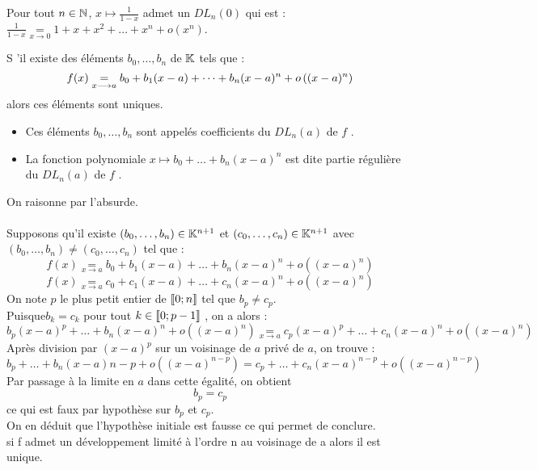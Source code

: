 \begin{defprop}
    Pour tout \(n \in  \mathbb{N}\), \(x \mapsto  \frac{1}{1 - x}\) admet un \(DL_n(0)\) qui est : \(\frac{1}{1 - x} \underset{x \to 0}{=} 1 + x + x^2 + \dots + x^n + o(x^n)\).
\end{defprop}

\begin{defprop}
   S ’il existe des éléments \(b_0, \dots, b_n\) de \(\mathbb{K}\) tels que :
   \[f (x) \underset{x \longrightarrow a}{=} b_0 + b_1(x - a) + \dots + b_n(x - a)^n + o \left((x - a)^n\right)\]
   alors ces éléments sont uniques.
   \begin{itemize}
        \item Ces éléments \(b_0, \dots, b_n\) sont appelés coefficients du \(DL_n(a)\) de \(f\) .
        \item La fonction polynomiale \(x \mapsto  b_0 + \dots + b_n(x - a)^n\) est dite partie régulière du \(DL_n(a)\) de \(f\) .
   \end{itemize}
\end{defprop}

\begin{dem}
    On raisonne par l’absurde.\\~\\
    Supposons qu’il existe \((b_0, \dots, b_n) \in \mathbb{K}^{n+1}\) et \((c_0, \dots, c_n) \in \mathbb{K}^{n+1}\) avec \((b_0, \dots, b_n)\neq (c_0, \dots, c_n)\) tel que :
    \[f (x) \underset{x \to a}{=} b_0 + b_1(x - a) + \dots + b_n(x - a)^n + o ((x - a)^n)\]
    \[f (x) \underset{x \to a}{=} c_0 + c_1(x - a) + \dots + c_n(x - a)^n + o ((x - a)^n)\]
    On note \(p\) le plus petit entier de \(\left\llbracket0;n\right\rrbracket\) tel que \(b_p\neq c_p\).\\
    Puisque\( b_k = c_k\) pour tout \(k \in \left\llbracket0;p - 1\right\rrbracket\) , on a alors :\\
    \[b_p(x - a)^p + \dots + b_n(x - a)^n + o ((x - a)^n) \underset{x \to a}{=} c_p(x - a)^p + \dots + c_n(x - a)^n + o ((x - a)^n)\]
    Après division par \((x - a)^p\) sur un voisinage de \(a\) privé de \(a\), on trouve :
    \[b_p + \dots + b_n(x - a){n-p} + o ((x - a)^{n-p}) = c_p + \dots + c_n(x - a)^{n-p} + o ((x - a)^{n-p})\]
    Par passage à la limite en \(a\) dans cette égalité, on obtient
    \[b_p = c_p\]
    ce qui est faux par hypothèse sur \(b_p\) et \(c_p\).\\
    On en déduit que l’hypothèse initiale est fausse ce qui permet de conclure.\\
    \conclusion si f admet un développement limité à l’ordre n au voisinage de a alors il est unique.
\end{dem}



